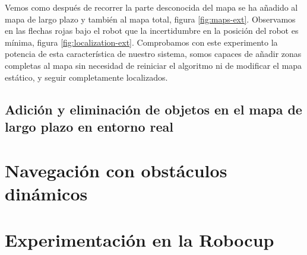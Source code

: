   Vemos como después de recorrer la parte desconocida del mapa se ha añadido al mapa de largo plazo y también al mapa total, figura \ref{fig:maps-ext}. Observamos en las flechas rojas bajo el robot que la incertidumbre en la posición del robot es mínima, figura \ref{fig:localization-ext}. Comprobamos con este experimento la potencia de esta característica de nuestro sistema, somos capaces de añadir zonas completas al mapa sin necesidad de reiniciar el algoritmo ni de modificar el mapa estático, y seguir completamente localizados.

\subsection {Adición y eliminación de objetos en el mapa de largo plazo en entorno real}
\label{sec:add-deleteobjectslongreal}

\section {Navegación con obstáculos dinámicos}
\label{cap:navegacionconobstaculos}

\section {Experimentación en la Robocup}
\label{cap:experimentacionrobocup}










